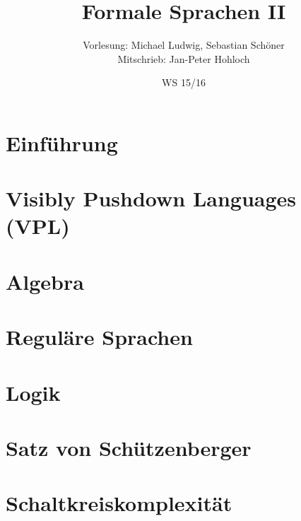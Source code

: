 \documentclass[german,a4paper,10pt]{scrreprt}
\title{Formale Sprachen II}
\author{Vorlesung: Michael Ludwig, Sebastian Schöner\\
Mitschrieb: Jan-Peter Hohloch}
\date{WS 15/16}
\begin{document}
    \maketitle
    \tableofcontents
    \newpage
    \chapter{Einführung}
        
    \chapter{Visibly Pushdown Languages (VPL)}
        
    \chapter{Algebra}
        
    \chapter{Reguläre Sprachen}
        
    \chapter{Logik}
        
    \chapter{Satz von Schützenberger}
        
    \chapter{Schaltkreiskomplexität}
        
\end{document}
